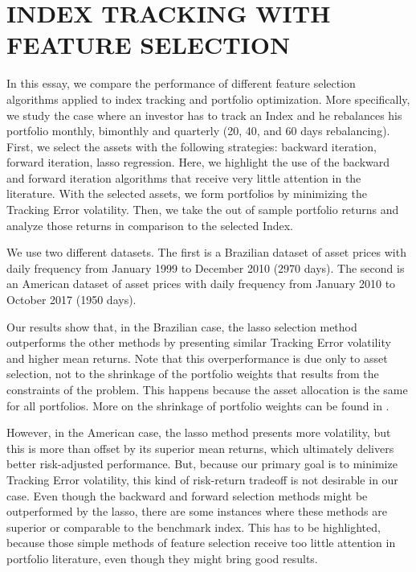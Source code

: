 \documentclass[12pt,oneside,a4paper]{memoir}
\begin{document}
\chapter{INDEX TRACKING WITH FEATURE SELECTION}

In this essay, we compare the performance of different feature selection algorithms applied to index tracking and portfolio optimization.
More specifically, we study the case where an investor has to track an Index and he rebalances his portfolio monthly, bimonthly and quarterly (20, 40, and 60 days rebalancing).
First, we select the assets with the following strategies:
backward iteration, forward iteration, lasso regression.
Here, we highlight the use of the backward and forward iteration algorithms that receive very little attention in the literature.
With the selected assets, we form portfolios by minimizing the Tracking Error volatility.
Then, we take the out of sample portfolio returns and analyze those returns in comparison to the selected Index.

We use two different datasets.
The first is a Brazilian dataset of asset prices with daily frequency from January 1999 to December 2010 (2970 days).
The second is an American dataset of asset prices with daily frequency from January 2010 to October 2017 (1950 days).

Our results show that, in the Brazilian case, the lasso selection method outperforms the other methods by presenting similar Tracking Error volatility and higher mean returns.
Note that this overperformance is due only to asset selection, not to the shrinkage of the portfolio weights that results from the constraints of the problem.
This happens because the asset allocation is the same for all portfolios.
More on the shrinkage of portfolio weights can be found in .

However, in the American case, the lasso method presents more volatility, but this is more than offset by its superior mean returns, which ultimately delivers better risk-adjusted performance.
But, because our primary goal is to minimize Tracking Error volatility, this kind of risk-return tradeoff is not desirable in our case.
Even though the backward and forward selection methods might be outperformed by the lasso, there are some instances where these methods are superior or comparable to the benchmark index. 
This has to be highlighted, because those simple methods of feature selection receive too little attention in portfolio literature, even though they might bring good results.
\end{document}
